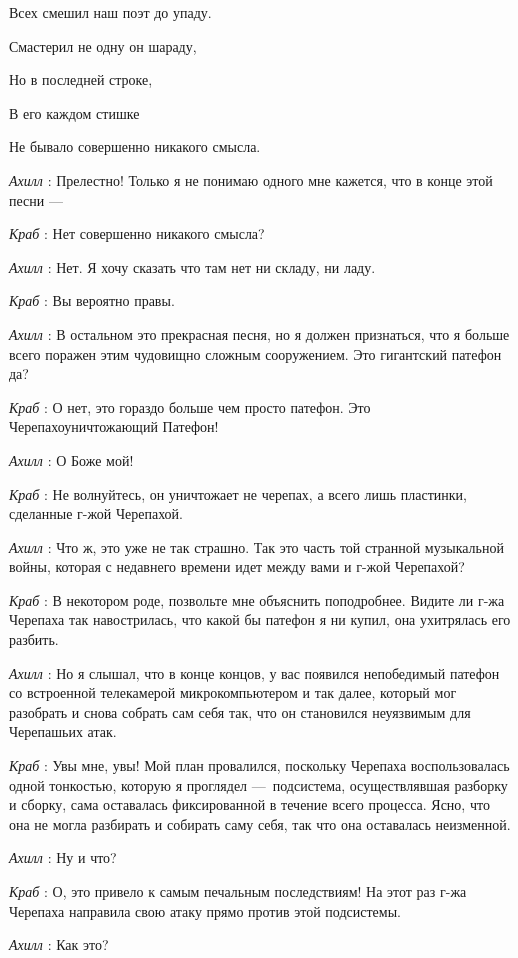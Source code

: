Всех смешил наш поэт до упаду.

Смастерил не одну он шараду,

Но в последней строке,

В его каждом стишке

Не бывало совершенно никакого смысла.

\emph{Ахилл} : Прелестно! Только я не понимаю одного мне кажется, что в конце этой песни ---

\emph{Краб} : Нет совершенно никакого смысла?

\emph{Ахилл} : Нет. Я хочу сказать что там нет ни складу, ни ладу.

\emph{Краб} : Вы вероятно правы.

\emph{Ахилл} : В остальном это прекрасная песня, но я должен признаться, что я больше всего поражен этим чудовищно сложным сооружением. Это гигантский патефон да?

\emph{Краб} : О нет, это гораздо больше чем просто патефон. Это Черепахоуничтожающий Патефон!

\emph{Ахилл} : О Боже мой!

\emph{Краб} : Не волнуйтесь, он уничтожает не черепах, а всего лишь пластинки, сделанные г-жой Черепахой.

\emph{Ахилл} : Что ж, это уже не так страшно. Так это часть той странной музыкальной войны, которая с недавнего времени идет между вами и г-жой Черепахой?

\emph{Краб} : В некотором роде, позвольте мне объяснить поподробнее. Видите ли г-жа Черепаха так навострилась, что какой бы патефон я ни купил, она ухитрялась его разбить.

\emph{Ахилл} : Но я слышал, что в конце концов, у вас появился непобедимый патефон со встроенной телекамерой микрокомпьютером и так далее, который мог разобрать и снова собрать сам себя так, что он становился неуязвимым для Черепашьих атак.

\emph{Краб} : Увы мне, увы! Мой план провалился, поскольку Черепаха воспользовалась одной тонкостью, которую я проглядел ---~подсистема, осуществлявшая разборку и сборку, сама оставалась фиксированной в течение всего процесса. Ясно, что она не могла разбирать и собирать саму себя, так что она оставалась неизменной.

\emph{Ахилл} : Ну и что?

\emph{Краб} : О, это привело к самым печальным последствиям! На этот раз г-жа Черепаха направила свою атаку прямо против этой подсистемы.

\emph{Ахилл} : Как это?

